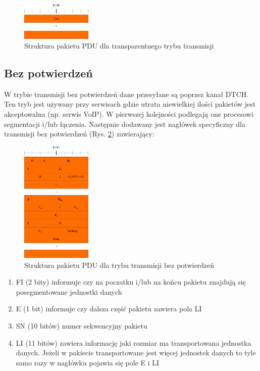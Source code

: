 \begin{figure}
	\centerline{\includegraphics[width=0.3\textwidth]{images/rlc_tm_pdu.png}}
	\caption{Struktura pakietu PDU dla transparentnego trybu transmisji}
	\label{fig:rlc_tm_pdu}
\end{figure}

\subsection{Bez potwierdzeń}
\label{subsec:um}

W trybie transmisji bez potwierdzeń dane przesyłane są poprzez kanał DTCH. Ten tryb jest używany przy serwisach gdzie utrata niewielkiej ilości pakietów jest akceptowalna (np. serwis VoIP). W pierwszej kolejności podlegają one procesowi segmentacji i/lub łączenia. Następnie dodawany jest nagłówek specyficzny dla transmisji bez potwierdzeń (Rys. \ref{fig:rlc_um_pdu}) zawierający: 

\begin{figure}
	\centerline{\includegraphics[width=0.3\textwidth]{images/rlc_um_pdu.png}}
	\caption{Struktura pakietu PDU dla trybu transmisji bez potwierdzeń}
	\label{fig:rlc_um_pdu}
\end{figure}

\begin{enumerate}
	\item FI (2 bity) informuje czy na poczatku i/lub na końcu pakietu znajdują się posegmentowane jednostki danych	
	\item E (1 bit) informuje czy dalsza część pakietu zawiera pola LI
	\item SN (10 bitów) numer sekwencyjny pakietu
	\item LI (11 bitów) zawiera informację jaki rozmiar ma transportowana jednostka danych. Jeżeli w pakiecie transportowane jest więcej jednostek danych to tyle samo razy w nagłówku pojawia się pole E i LI
\end{enumerate}

